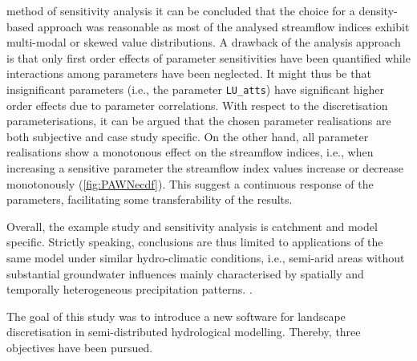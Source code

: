 \DIFaddend method of sensitivity analysis it can be concluded that the choice for a density-based approach was reasonable as most of the analysed streamflow indices exhibit multi-modal or skewed value distributions.
A drawback of the analysis approach is that only first order effects of parameter sensitivities have been quantified while interactions among parameters have been neglected.
It might thus be that insignificant parameters (i.e., the parameter \verb!LU_atts!) have significant higher order effects due to parameter correlations.
With respect to the discretisation parameterisations, it can be argued that the chosen parameter realisations are both subjective and case study specific.
On the other hand, all parameter realisations show a monotonous effect on the streamflow indices, i.e., when increasing a sensitive parameter the streamflow index values increase or decrease monotonously (\DIFdelbegin {}\DIFdelend \DIFaddbegin {}\DIFaddend \ref{fig:PAWNecdf}).
This suggest a continuous response of the parameters, facilitating some transferability of the results.

Overall, the example study and sensitivity analysis is catchment and model specific.
Strictly speaking, conclusions are thus limited to applications of the same model under similar hydro-climatic conditions, i.e., semi-arid areas without substantial groundwater influences mainly characterised by spatially and temporally heterogeneous precipitation patterns.
\DIFdelbegin {}\DIFdelend \DIFaddbegin {}\DIFaddend .




\conclusions  %
\label{sec:conclusions}
The goal of this study was to introduce a new software for landscape discretisation in semi-distributed hydrological modelling.
Thereby, three objectives have been pursued.

